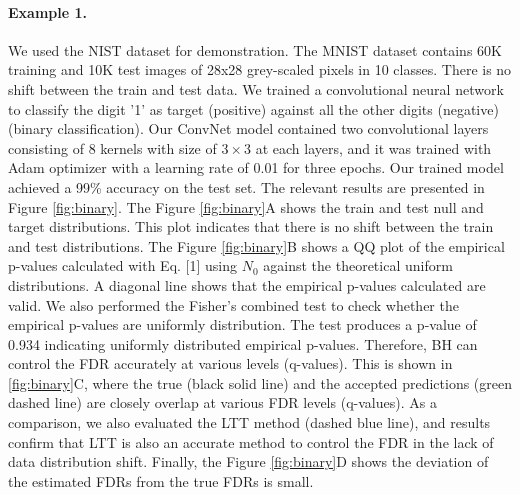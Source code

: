 \documentclass{article}
\begin{document}
\paragraph{Example 1.} \label{ex:vanilla} We used the NIST dataset for demonstration. The MNIST dataset contains 60K training and 10K test images of 28x28 grey-scaled pixels in 10 classes. There is no shift between the train and test data. We trained a convolutional neural network to classify the digit '1' as target (positive) against all the other digits (negative) (binary classification). Our ConvNet model contained two convolutional layers consisting of 8 kernels with size of $3\times3$ at each layers, and it was trained with Adam optimizer with a learning rate of 0.01 for three epochs. Our trained model achieved a 99\% accuracy on the test set. The relevant results are presented in Figure \ref{fig:binary}. The Figure \ref{fig:binary}A shows the train and test null and target distributions. This plot indicates that there is no shift between the train and test distributions. The Figure \ref{fig:binary}B shows a QQ plot of the empirical p-values calculated with Eq. [1] using $N_0$ against the theoretical uniform distributions. A diagonal line shows that the empirical p-values calculated are valid. We also performed the Fisher's combined test to check whether the empirical p-values are uniformly distribution. The test produces a p-value of 0.934 indicating uniformly distributed empirical p-values. Therefore, BH can control the FDR accurately at various levels (q-values). This is shown in \ref{fig:binary}C, where the true (black solid line) and the accepted predictions (green dashed line) are closely overlap at various FDR levels (q-values). As a comparison, we also evaluated the LTT method \cite{angelopoulos2021learn} (dashed blue line), and results confirm that LTT is also an accurate method to control the FDR in the lack of data distribution shift. Finally, the Figure \ref{fig:binary}D shows the deviation of the estimated FDRs from the true FDRs is small.
\end{document}
